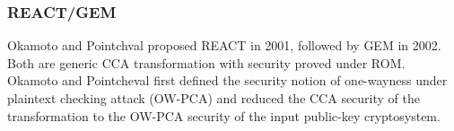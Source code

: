\documentclass[runningheads]{llncs}
\newcommand{\pke}{\texttt{PKE}}
\newcommand{\keygen}{\texttt{KeyGen}}
\newcommand{\encrypt}{\texttt{Enc}}
\newcommand{\decrypt}{\texttt{Dec}}
\newcommand{\pk}{\texttt{pk}}
\newcommand{\sk}{\texttt{sk}}
\begin{document}
\subsubsection{REACT/GEM} Okamoto and Pointchval proposed REACT \cite{DBLP:conf/ctrsa/OkamotoP01} in 2001, followed by GEM \cite{DBLP:conf/ctrsa/CoronHJPPT02} in 2002. Both are generic CCA transformation with security proved under ROM. Okamoto and Pointcheval first defined the security notion of one-wayness under plaintext checking attack (OW-PCA) and reduced the CCA security of the transformation to the OW-PCA security of the input public-key cryptosystem.

\end{document}

